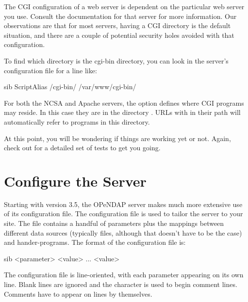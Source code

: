 \documentclass{dods-book}
\begin{document}

The CGI configuration of a web server is dependent on the particular
web server you use. Consult the documentation for that server for more
information. Our observations are that for most servers, having a CGI
directory is the default situation, and there are a couple of
potential security holes avoided with that configuration.

To find which directory is the cgi-bin directory, you can
look in the server's configuration file for a line like:

\begin{vcode}{sib}
ScriptAlias /cgi-bin/ /var/www/cgi-bin/
\end{vcode}

For both the NCSA and Apache servers, the option 
defines where CGI programs may reside. In this case they are in the
directory .  URLs with  in their
path will automatically refer to programs in this directory.

At this point, you will be wondering if things are working yet or not.
Again, check out  for a detailed set of
tests to get you going.

\section{Configure the Server}
\label{install,config,server}

Starting with version 3.5, the OPeNDAP server makes much more
extensive use of its configuration file. The 
configuration file is used to tailor the server to your site. The file
contains a handful of parameters plus the mappings between different
data sources (typically files, although that doesn't have to be the
case) and hander-programs. The format of the configuration file is:
  

\begin{vcode}{sib}
     <parameter> <value> ... <value>
\end{vcode}

  The configuration file is line-oriented, with each parameter appearing on
  its own line. Blank lines are ignored and the \lit{\#} character is used to
  begin comment lines. Comments have to appear on lines by themselves.
\end{document}
